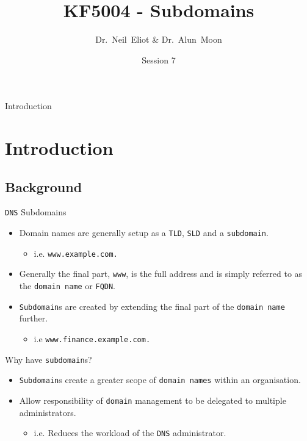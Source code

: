 \documentclass[xcolor=table,aspectratio=169]{beamer}
\title{KF5004 - Subdomains}
\author{Dr.~Neil~Eliot \& Dr.~Alun~Moon}
\institute[Northumbria University] %
{
  Department of Computer and Information Sciences\\
  University of Northumbria
}
\date{Session 7}
\begin{document}
\begin{frame}
  \titlepage
\end{frame}

\begin{frame}{Introduction}
  \tableofcontents
\end{frame}


\section{Introduction}
\subsection{Background}
\begin{frame}{\texttt{DNS} Subdomains}
  \begin{itemize}
    \item Domain names are generally setup as a \texttt{TLD}, \texttt{SLD} and a \texttt{subdomain}.
      \begin{itemize}
        \item i.e. \texttt{www.example.com.}
      \end{itemize}
    \item Generally the final part, \texttt{www}, is the full address and is simply referred to as the \texttt{domain name} or \texttt{FQDN}.
    \item \texttt{Subdomain}s are created by extending the final part of the \texttt{domain name} further.
      \begin{itemize}
        \item i.e \texttt{www.finance.example.com.}
      \end{itemize}
  \end{itemize}
\end{frame}

\begin{frame}{Why have \texttt{subdomain}s?}
  \begin{itemize}
    \item \texttt{Subdomain}s create a greater scope of \texttt{domain names} within an organisation.
    \item Allow responsibility of \texttt{domain} management to be delegated to multiple administrators.
    \begin{itemize}
      \item i.e. Reduces the workload of the \texttt{DNS} administrator.
    \end{itemize}
  \end{itemize}
\end{frame}
\end{document}
